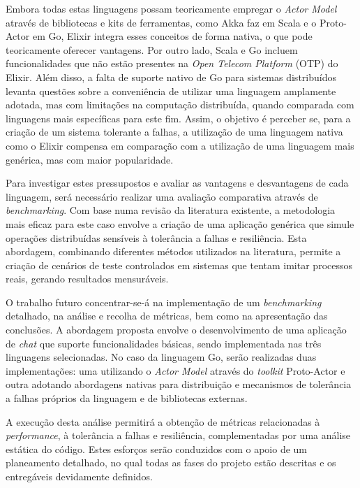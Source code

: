 \begin{abstractotherlanguage}
Embora todas estas linguagens possam teoricamente empregar o \textit{Actor Model} através de bibliotecas e kits de ferramentas, como Akka faz em Scala e o Proto-Actor em Go, Elixir integra esses conceitos de forma nativa, o que pode teoricamente oferecer vantagens. Por outro lado, Scala e Go incluem funcionalidades que não estão presentes na \textit{Open Telecom Platform} (OTP) do Elixir. Além disso, a falta de suporte nativo de Go para sistemas distribuídos levanta questões sobre a conveniência de utilizar uma linguagem amplamente adotada, mas com limitações na computação distribuída, quando comparada com linguagens mais específicas para este fim. Assim, o objetivo é perceber se, para a criação de um sistema tolerante a falhas, a utilização de uma linguagem nativa como o Elixir compensa em comparação com a utilização de uma linguagem mais genérica, mas com maior popularidade.

Para investigar estes pressupostos e avaliar as vantagens e desvantagens de cada linguagem, será necessário realizar uma avaliação comparativa através de \textit{benchmarking}. Com base numa revisão da literatura existente, a metodologia mais eficaz para este caso envolve a criação de uma aplicação genérica que simule operações distribuídas sensíveis à tolerância a falhas e resiliência. Esta abordagem, combinando diferentes métodos utilizados na literatura, permite a criação de cenários de teste controlados em sistemas que tentam imitar processos reais, gerando resultados mensuráveis.

O trabalho futuro concentrar-se-á na implementação de um \textit{benchmarking} detalhado, na análise e recolha de métricas, bem como na apresentação das conclusões. A abordagem proposta envolve o desenvolvimento de uma aplicação de \textit{chat} que suporte funcionalidades básicas, sendo implementada nas três linguagens selecionadas. No caso da linguagem Go, serão realizadas duas implementações: uma utilizando o \textit{Actor Model} através do \textit{toolkit} Proto-Actor e outra adotando abordagens nativas para distribuição e mecanismos de tolerância a falhas próprios da linguagem e de bibliotecas externas.

A execução desta análise permitirá a obtenção de métricas relacionadas à \textit{performance}, à tolerância a falhas e resiliência, complementadas por uma análise estática do código. Estes esforços serão conduzidos com o apoio de um planeamento detalhado, no qual todas as fases do projeto estão descritas e os entregáveis devidamente definidos.

\end{abstractotherlanguage}

